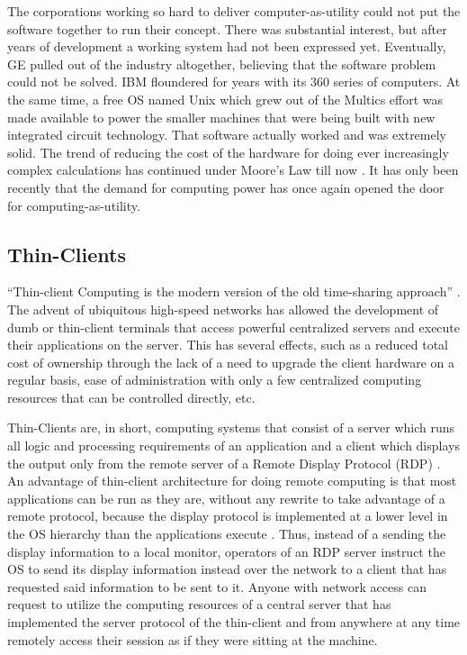 The corporations working so hard to deliver computer-as-utility could not put
the software together to run their concept.  There was substantial interest, but
after years of development a working system had not been expressed yet.
Eventually, GE pulled out of the industry altogether, believing that the
software problem could not be solved.  IBM floundered for years with its 360
series of computers.  At the same time, a free OS named Unix which grew out of
the Multics effort was made available to power the smaller machines that were
being built with new integrated circuit technology.  That software actually
worked and was extremely solid.  The trend of reducing the cost of the hardware
for doing ever increasingly complex calculations has continued under Moore's Law
till now \citep{kelly2004}.  It has only been recently that the demand for
computing power has once again opened the door for computing-as-utility.

\subsection{Thin-Clients}

``Thin-client Computing is the modern version of the old time-sharing approach''
\citep{schmidt1999}.  The advent of ubiquitous high-speed networks has allowed
the development of dumb or thin-client terminals that access powerful
centralized servers and execute their applications on the server.  This has
several effects, such as a reduced total cost of ownership through the lack of a
need to upgrade the client hardware on a regular basis, ease of administration
with only a few centralized computing resources that can be controlled directly,
etc.

Thin-Clients are, in short, computing systems that consist of a server which
runs all logic and processing requirements of an application and a client which
displays the output only from the remote server of a Remote Display Protocol
(RDP) \citep{lai2002}.  An advantage of thin-client architecture for doing remote
computing is that most applications can be run as they are, without any rewrite
to take advantage of a remote protocol, because the display protocol is
implemented at a lower level in the OS hierarchy than the applications execute
\citep{schmidt1999}.  Thus, instead of a sending the display information to a local
monitor, operators of an RDP server instruct the OS to send its display
information instead over the network to a client that has requested said
information to be sent to it.  Anyone with network access can request to utilize
the computing resources of a central server that has implemented the server
protocol of the thin-client and from anywhere at any time remotely access their
session as if they were sitting at the machine.

